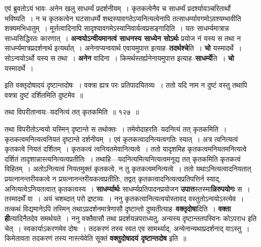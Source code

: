 \documentclass[article,12pt,a4paper]{memoir}
\begin{document}
	  \pstart एवं ब्रुवतोऽयं भावः--अनेन खलु साधर्म्यं प्रदर्शनीयम् । कृतकत्वेनैव च साधर्म्यं प्रदर्श्यायञ्चरितार्थो भविष्यति । न च कृतकत्वेन घटसाधर्म्ये शब्दस्यावगतेऽप्यनित्यत्वेनापि तत्साधर्म्यावगमोऽवश्यम्भावीति शक्यमभिधातुम् । मूर्त्तत्वादिनापि सादृश्यावगमेऽस्यानिवार्यत्वप्रसङ्गादिति । यतः साधर्म्यमात्रान्न साध्यसिद्धिरतः कारणात् । \textbf{अन्वयोऽन्वीयमानत्वं साधनस्य साध्येन सोऽर्थः} प्रयोज \leavevmode{} नं यस्य स तथा न साधर्म्यमात्रप्रदर्शनार्थ इत्यर्थात् । अनेनाप्यन्वयार्थ एवायमुपात्त इत्याह--\textbf{तदर्थश्चे}ति । \textbf{चो} यस्मादर्थे । सोऽन्वयोऽर्थो यस्य स तथा । \textbf{अनेन} वादिना । किमर्थस्तर्ह्यनेनायमुपात्त इत्याह--\textbf{साधर्म्ये}ति । \textbf{चो} यस्मादर्थे ।  \leavevmode{} 
	  
	इति वक्तृदोषादयं दृष्टान्तदोषः । वक्त्रा ह्यत्र परः प्रतिपादयितव्यः । ततो यदि नाम न दुष्टं वस्तु तथापि वक्त्रा दुष्टं दर्शितमिति दुष्टमेव ॥  
	  
	तथा विपरीतान्वयः--यदनित्यं तत् कृतकमिति ॥ १२७ ॥ 
	  
	तथा विपरीतोऽन्वयो यस्मिन् दृष्टान्ते स तथोक्तः । तमेवोदाहरति--यदनित्यं तत् कृतकमिति । कृतकत्वमनित्यत्वनियतं दृष्टान्ते दर्शनीयम् । एवं कृतकत्वादनित्यत्वगतिः स्यात् । अत्र त्वनित्यत्वं कृतकत्वे नियतं दर्शितम् । कृतकत्वं त्वनियतमेवानित्यत्वे । ततो यादृशमिह कृतकत्वमनियतमनित्यत्वे दर्शितं तादृशान्नास्त्यनित्यत्वप्रतीतिः । तथाहि—यदनित्यमित्यनित्यत्वमनूद्य तत् कृतकमिति कृतकत्वं विहितम् । अतोऽनित्यत्वं नियतमुक्तं कृतकत्वे, न तु कृतकत्वमनित्यत्वे । ततो यथाऽनित्यत्वादनियतात् प्रयत्नानन्तरीयकत्वे न प्रयत्नानन्तरीयकत्वप्रतीतिः, तद्वत् कृतकत्वादनित्यत्वप्रतिपत्तिर्न स्याद्, अनित्यत्वेऽनियतत्वात् कृतकत्वस्य । \textbf{साधर्म्यार्थः} साधर्म्यप्रतिपादनप्रयोजन \textbf{उपात्त}स्तस्मा\textbf{न्निरुपयोगः} स । तस्मादर्थें वा । अयं चशब्दात् परो द्रष्टव्यः । ननु कृतकत्वानित्यत्वयोस्तावद् वस्तुतोऽन्वयोऽस्त्येव । तत्कथं विद्यमानेऽपि तस्मिन् तथाऽप्रदर्शनमात्रेणासौ दृष्टान्तो दुष्यतीत्याह--\textbf{वक्तृदोषा}दिति । \textbf{वक्ता ही}त्यादिनैतदेव समर्थयते । ननु वक्तैवासौ तथा प्रदर्शयन्नपराध्यतु, अन्यस्य दृष्टान्ततपस्विनः कोऽपराध इति चेत् । स्वकार्याऽकरणमेव दोषः । तदकरणं तस्य स्वत एव सामर्थ्याद्, अन्येनान्यथाप्रदर्शनाद् वाऽस्तु । किमेतावता तदकरणं तस्य नास्त्येवेति सूक्तं \textbf{वक्तुदोषादयं दृष्टान्तदोष} इति ॥
	\pend
      
\end{document}
